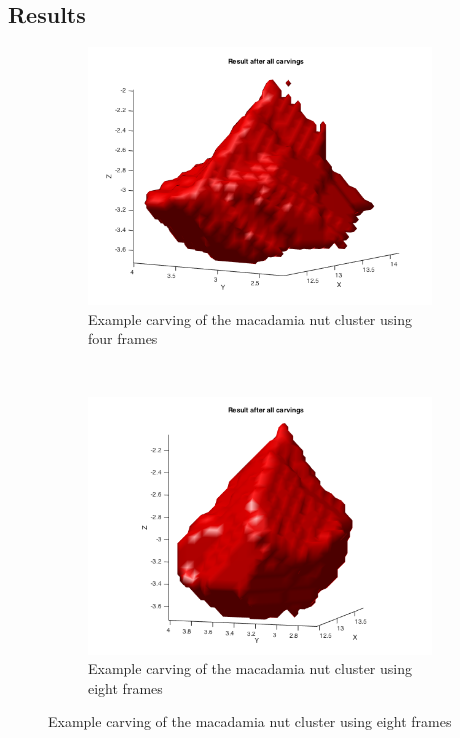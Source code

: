 \documentclass[10pt,twocolumn,letterpaper]{article}
\begin{document}
\subsection{Results}
\begin{figure}
    \centering
    \begin{subfigure}[t]{0.3\textwidth}
        \centering
        \includegraphics[width=\textwidth]{macadamia_4.png}
        \caption{Example carving of the macadamia nut cluster using four frames}
    \end{subfigure}
    ~ 
    \begin{subfigure}[t]{0.3\textwidth}
        \centering
        \includegraphics[width=\textwidth]{macadamia_8.png}
        \caption{Example carving of the macadamia nut cluster using eight frames}

\end{subfigure}
\end{figure}
\end{document}
